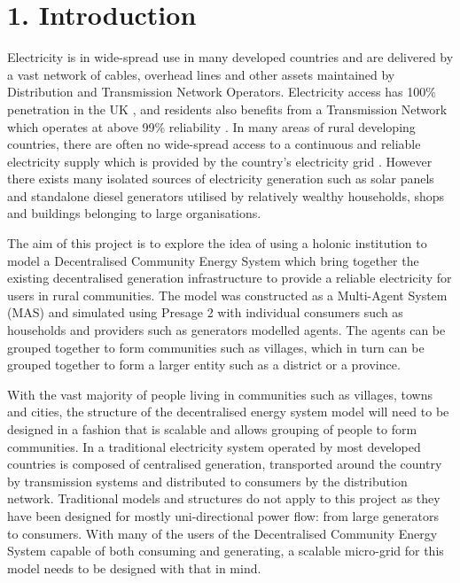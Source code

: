 \chapter{1. Introduction}
\label{introduction}

Electricity is in wide-spread use in many developed countries and are delivered by a vast network of cables, overhead lines and other assets maintained by Distribution and Transmission Network Operators. Electricity access has 100\% penetration in the UK \cite{World-Bank-web:2015}, and residents also benefits from a Transmission Network which operates at above 99\% reliability \cite{NG-web:2015}. In many areas of rural developing countries, there are often no wide-spread access to a continuous and reliable electricity supply which is provided by the country's electricity grid \cite{IEA-web:2015}. However there exists many isolated sources of electricity generation such as solar panels and standalone diesel generators utilised by relatively wealthy households, shops and buildings belonging to large organisations. 

The aim of this project is to explore the idea of using a holonic institution to model a Decentralised Community Energy System which bring together the existing decentralised generation infrastructure to provide a reliable electricity for users in rural communities. The model was constructed as a Multi-Agent System (MAS) and simulated using Presage 2 with individual consumers such as households and providers such as generators modelled agents. The agents can be grouped together to form communities such as villages, which in turn can be grouped together to form a larger entity such as a district or a province. 

With the vast majority of people living in communities such as villages, towns and cities, the structure of the decentralised energy system model will need to be designed in a fashion that is scalable and allows grouping of people to form communities. In a traditional electricity system operated by most developed countries is composed of centralised generation, transported around the country by transmission systems and distributed to consumers by the distribution network. Traditional models and structures do not apply to this project as they have been designed for mostly uni-directional power flow: from large generators to consumers. With many of the users of the Decentralised Community Energy System capable of both consuming and generating, a scalable micro-grid for this model needs to be designed with that in mind.

